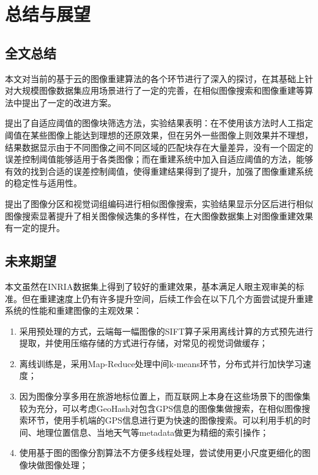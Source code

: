 
\chapter{总结与展望}

\section{全文总结}
本文对当前的基于云的图像重建算法的各个环节进行了深入的探讨，在其基础上针对大规模图像数据集应用场景进行了一定的完善，在相似图像搜索和图像重建等算法中提出了一定的改进方案。

提出了自适应阈值的图像块筛选方法，实验结果表明：在不使用该方法时人工指定阈值在某些图像上能达到理想的还原效果，但在另外一些图像上则效果并不理想，结果数据显示由于不同图像之间不同区域的匹配块存在大量差异，没有一个固定的误差控制阈值能够适用于各类图像；而在重建系统中加入自适应阈值的方法，能够有效的找到合适的误差控制阈值，使得重建结果得到了提升，加强了图像重建系统的稳定性与适用性。

提出了图像分区和视觉词组编码进行相似图像搜索，实验结果显示分区后进行相似图像搜索显著提升了相关图像候选集的多样性，在大图像数据集上对图像重建效果有一定的提升。



\section{未来期望}

本文虽然在INRIA数据集上得到了较好的重建效果，基本满足人眼主观审美的标准。但在重建速度上仍有许多提升空间，后续工作会在以下几个方面尝试提升重建系统的性能和重建图像的主观效果：

\begin{enumerate}
\item 采用预处理的方式，云端每一幅图像的SIFT算子采用离线计算的方式预先进行提取，并使用压缩存储的方式进行存储，对常见的视觉词做缓存；
\item 离线训练是，采用Map-Reduce处理中间k-means环节，分布式并行加快学习速度；
\item 因为图像分享多用在旅游地标位置上，而互联网上本身在这些场景下的图像集较为充分，可以考虑GeoHash对包含GPS信息的图像集做搜索，在相似图像搜索环节，使用手机端的GPS信息进行更为快速的图像搜索。可以利用手机的时间、地理位置信息、当地天气等metadata做更为精细的索引操作；
\item 使用基于图的图像分割算法不方便多线程处理，尝试使用更小尺度更细化的图像块做图像处理；
\end{enumerate}